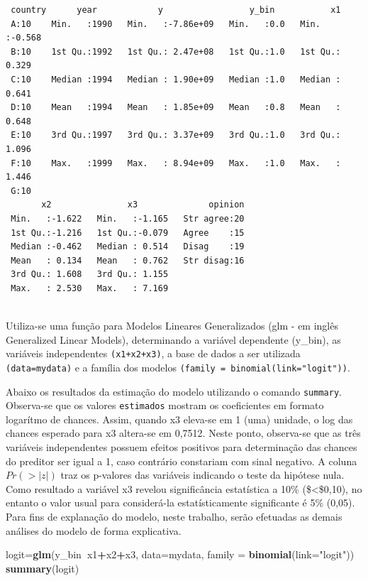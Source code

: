 \documentclass[12pt,brazil,oneside]{book}
\newenvironment{Shaded}{\begin{snugshade}}{\end{snugshade}}
\newcommand{\DataTypeTok}[1]{\textcolor[rgb]{0.13,0.29,0.53}{#1}}
\newcommand{\KeywordTok}[1]{\textcolor[rgb]{0.13,0.29,0.53}{\textbf{#1}}}
\newcommand{\NormalTok}[1]{#1}
\newcommand{\OperatorTok}[1]{\textcolor[rgb]{0.81,0.36,0.00}{\textbf{#1}}}
\newcommand{\StringTok}[1]{\textcolor[rgb]{0.31,0.60,0.02}{#1}}
\begin{document}
\begin{verbatim}
 country      year            y                 y_bin           x1        
 A:10    Min.   :1990   Min.   :-7.86e+09   Min.   :0.0   Min.   :-0.568  
 B:10    1st Qu.:1992   1st Qu.: 2.47e+08   1st Qu.:1.0   1st Qu.: 0.329  
 C:10    Median :1994   Median : 1.90e+09   Median :1.0   Median : 0.641  
 D:10    Mean   :1994   Mean   : 1.85e+09   Mean   :0.8   Mean   : 0.648  
 E:10    3rd Qu.:1997   3rd Qu.: 3.37e+09   3rd Qu.:1.0   3rd Qu.: 1.096  
 F:10    Max.   :1999   Max.   : 8.94e+09   Max.   :1.0   Max.   : 1.446  
 G:10                                                                     
       x2               x3              opinion  
 Min.   :-1.622   Min.   :-1.165   Str agree:20  
 1st Qu.:-1.216   1st Qu.:-0.079   Agree    :15  
 Median :-0.462   Median : 0.514   Disag    :19  
 Mean   : 0.134   Mean   : 0.762   Str disag:16  
 3rd Qu.: 1.608   3rd Qu.: 1.155                 
 Max.   : 2.530   Max.   : 7.169                 
                                                 
\end{verbatim}

Utiliza-se uma função para Modelos Lineares Generalizados (glm - em
inglês Generalized Linear Models), determinando a variável dependente
(y\_bin), as variáveis independentes \texttt{(x1+x2+x3)}, a base de
dados a ser utilizada \texttt{(data=mydata)} e a família dos modelos
\texttt{(family\ =\ binomial(link="logit"))}.

Abaixo os resultados da estimação do modelo utilizando o comando
\texttt{summary}. Observa-se que os valores \texttt{estimados} mostram
os coeficientes em formato logarítmo de chances. Assim, quando x3
eleva-se em 1 (uma) unidade, o log das chances esperado para x3
altera-se em 0,7512. Neste ponto, observa-se que as três variáveis
independentes possuem efeitos positivos para determinação das chances do
preditor ser igual a 1, caso contrário constariam com sinal negativo. A
coluna \(Pr(>|z|)\) traz os p-valores das variáveis indicando o teste da
hipótese nula. Como resultado a variável x3 revelou significância
estatística a 10\% (\$\textless{}\$0,10), no entanto o valor usual para
considerá-la estatísticamente significante é 5\% (0,05). Para fins de
explanação do modelo, neste trabalho, serão efetuadas as demais análises
do modelo de forma explicativa.

\begin{Shaded}
\begin{Highlighting}[]
\NormalTok{logit=}\KeywordTok{glm}\NormalTok{(y_bin}\OperatorTok{~}\NormalTok{x1}\OperatorTok{+}\NormalTok{x2}\OperatorTok{+}\NormalTok{x3, }\DataTypeTok{data=}\NormalTok{mydata, }\DataTypeTok{family =} \KeywordTok{binomial}\NormalTok{(}\DataTypeTok{link=}\StringTok{"logit"}\NormalTok{))}
\KeywordTok{summary}\NormalTok{(logit)}
\end{Highlighting}
\end{Shaded}
\end{document}

